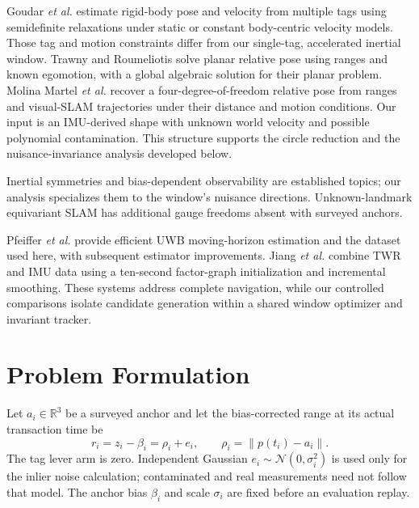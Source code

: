 \documentclass[conference,letterpaper,10pt]{IEEEtran}
\newcommand{\R}{\mathbb{R}}
\newcommand{\norm}[1]{\left\lVert#1\right\rVert}
\begin{document}
Goudar \emph{et al.} estimate rigid-body pose and velocity from multiple tags using semidefinite relaxations under static or constant body-centric velocity models\cite{goudar2024}. Those tag and motion constraints differ from our single-tag, accelerated inertial window. Trawny and Roumeliotis solve planar relative pose using ranges and known egomotion, with a global algebraic solution for their planar problem\cite{trawny2010}. Molina Martel \emph{et al.} recover a four-degree-of-freedom relative pose from ranges and visual-SLAM trajectories under their distance and motion conditions\cite{molina2019}. Our input is an IMU-derived shape with unknown world velocity and possible polynomial contamination. This structure supports the circle reduction and the nuisance-invariance analysis developed below.

Inertial symmetries and bias-dependent observability are established topics\cite{barrau2017,fornasier2025,hong2005}; our analysis specializes them to the window's nuisance directions. Unknown-landmark equivariant SLAM\cite{ge2025} has additional gauge freedoms absent with surveyed anchors.

Pfeiffer \emph{et al.} provide efficient UWB moving-horizon estimation and the dataset used here\cite{pfeiffer2021,pfeifferdata2021}, with subsequent estimator improvements\cite{pfeiffer2025}. Jiang \emph{et al.} combine TWR and IMU data using a ten-second factor-graph initialization and incremental smoothing\cite{jiang2024}. These systems address complete navigation, while our controlled comparisons isolate candidate generation within a shared window optimizer and invariant tracker.

\section{Problem Formulation}
Let $a_i\in\R^3$ be a surveyed anchor and let the bias-corrected range at its actual transaction time be
\begin{equation}
 r_i=z_i-\beta_i=\rho_i+e_i,\qquad
 \rho_i=\norm{p(t_i)-a_i}.
 \label{eq:range}
\end{equation}
The tag lever arm is zero. Independent Gaussian $e_i\sim\mathcal N(0,\sigma_i^2)$ is used only for the inlier noise calculation; contaminated and real measurements need not follow that model. The anchor bias $\beta_i$ and scale $\sigma_i$ are fixed before an evaluation replay.
\end{document}
